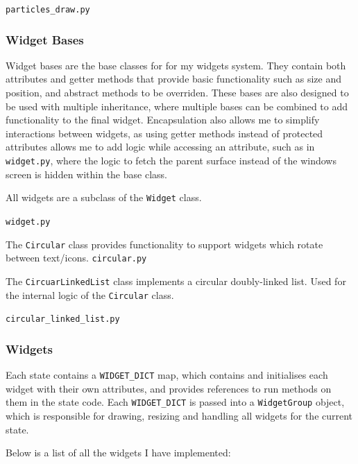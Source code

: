 \documentclass[../main/main.tex]{subfiles}
\begin{document}
\noindent\verb|particles_draw.py|


\subsubsection{Widget Bases}
\label{sec:widget-bases}
Widget bases are the base classes for for my widgets system. They contain both attributes and getter methods that provide basic functionality such as size and position, and abstract methods to be overriden. These bases are also designed to be used with multiple inheritance, where multiple bases can be combined to add functionality to the final widget. Encapsulation also allows me to simplify interactions between widgets, as using getter methods instead of protected attributes allows me to add logic while accessing an attribute, such as in \verb|widget.py|, where the logic to fetch the parent surface instead of the windows screen is hidden within the base class.

\bigskip
\noindent All widgets are a subclass of the \lstinline{Widget} class.

\noindent\verb|widget.py|


\bigskip
\noindent The \lstinline{Circular} class provides functionality to support widgets which rotate between text/icons.
\noindent\verb|circular.py|


\bigskip
\noindent The \lstinline{CircuarLinkedList} class implements a circular doubly-linked list. Used for the internal logic of the \lstinline{Circular} class.

\noindent\verb|circular_linked_list.py|


\subsubsection{Widgets}
\label{sec:widgets}
Each state contains a \lstinline{WIDGET_DICT} map, which contains and initialises each widget with their own attributes, and provides references to run methods on them in the state code. Each \lstinline{WIDGET_DICT} is passed into a \lstinline{WidgetGroup} object, which is responsible for drawing, resizing and handling all widgets for the current state.

Below is a list of all the widgets I have implemented:
\end{document}
